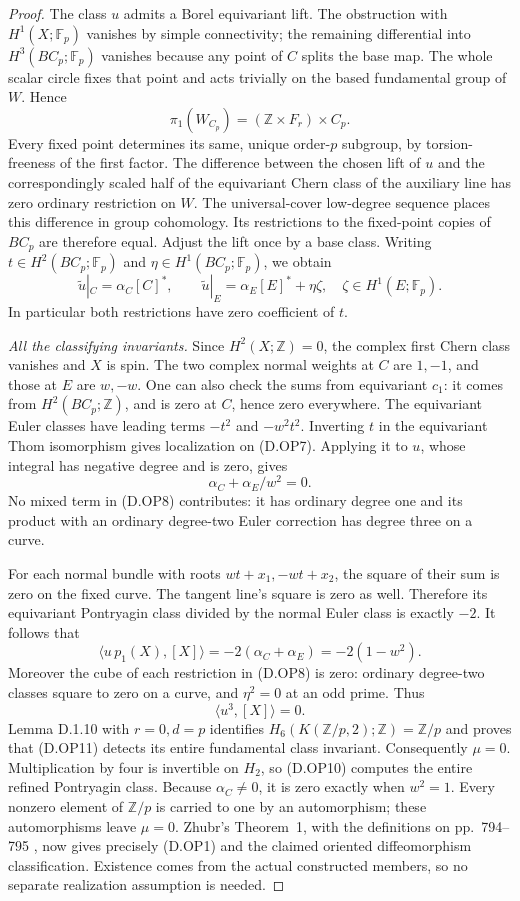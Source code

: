 \begin{proof}
The class $u$ admits a Borel equivariant lift. The obstruction
with $H^1(X;\mathbb F_p)$ vanishes by simple connectivity;
the remaining differential into $H^3(BC_p;\mathbb F_p)$
vanishes because any point of $C$ splits the base map.
The whole scalar circle fixes that point and acts trivially
on the based fundamental group of $W$. Hence
\[
 \pi_1(W_{C_p})=(\mathbb Z\times F_r)\times C_p.
\]
Every fixed point determines its same, unique order-$p$
subgroup, by torsion-freeness of the first factor.
The difference between the chosen lift of $u$ and the correspondingly scaled half of
the equivariant Chern class of the auxiliary line has zero
ordinary restriction on $W$. The universal-cover low-degree
sequence places this difference in group cohomology.
Its restrictions to the fixed-point copies of $BC_p$ are
therefore equal. Adjust the lift once by a base class.
Writing $t\in H^2(BC_p;\mathbb F_p)$ and
$\eta\in H^1(BC_p;\mathbb F_p)$, we obtain
\[
 \widetilde u|_C=\alpha_C[C]^*,\qquad
 \widetilde u|_E=\alpha_E[E]^*+\eta\zeta,
                  \quad\zeta\in H^1(E;\mathbb F_p).
 \tag{D.OP8}
\]
In particular both restrictions have zero coefficient of $t$.

\emph{All the classifying invariants.}
Since $H^2(X;\mathbb Z)=0$, the complex first Chern class
vanishes and $X$ is spin. The two complex normal weights
at $C$ are $1,-1$, and those at $E$ are $w,-w$.
One can also check the sums from equivariant $c_1$:
it comes from $H^2(BC_p;\mathbb Z)$, and is zero at $C$,
hence zero everywhere. The equivariant Euler classes
have leading terms $-t^2$ and $-w^2t^2$.
Inverting $t$ in the equivariant Thom isomorphism gives
localization on (D.OP7). Applying it to $u$, whose integral
has negative degree and is zero, gives
\[
                      \alpha_C+\alpha_E/w^2=0.
 \tag{D.OP9}
\]
No mixed term in (D.OP8) contributes: it has ordinary
degree one and its product with an ordinary degree-two
Euler correction has degree three on a curve.

For each normal bundle with roots $wt+x_1,-wt+x_2$,
the square of their sum is zero on the fixed curve.
The tangent line's square is zero as well. Therefore its
equivariant Pontryagin class divided by the normal Euler
class is exactly $-2$. It follows that
\[
 \langle u\,p_1(X),[X]\rangle
   =-2(\alpha_C+\alpha_E)
   =-2(1-w^2).
 \tag{D.OP10}
\]
Moreover the cube of each restriction in (D.OP8) is zero:
ordinary degree-two classes square to zero on a curve,
and $\eta^2=0$ at an odd prime. Thus
\[
                        \langle u^3,[X]\rangle=0.
 \tag{D.OP11}
\]
Lemma D.1.10 with $r=0,d=p$ identifies
$H_6(K(\mathbb Z/p,2);\mathbb Z)=\mathbb Z/p$
and proves that (D.OP11) detects its entire fundamental
class invariant. Consequently $\mu=0$.
Multiplication by four is invertible on $H_2$, so
(D.OP10) computes the entire refined Pontryagin class.
Because $\alpha_C\ne0$, it is zero exactly when $w^2=1$.
Every nonzero element of $\mathbb Z/p$ is carried to one
by an automorphism; these automorphisms leave $\mu=0$.
Zhubr's Theorem~1, with the definitions on pp.~794--795
\cite{manZhubr75}, now gives precisely (D.OP1) and the
claimed oriented diffeomorphism classification. Existence
comes from the actual constructed members, so no separate
realization assumption is needed.


\end{proof}
